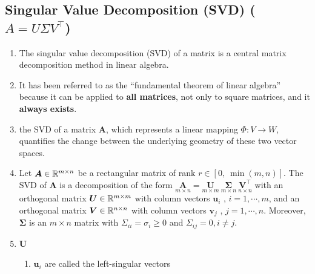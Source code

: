 \subsection{Singular Value Decomposition (SVD) ($A = U \Sigma V^\top$)}



\begin{enumerate}
    \item The singular value decomposition (SVD) of a matrix is a central matrix decomposition method in linear algebra.
    \hfill \cite{mfml/book/mml/Deisenroth-Faisal-Ong}

    \item It has been referred to as the “fundamental theorem of linear algebra” because it can be applied to \textbf{all matrices}, not only to square matrices, and it \textbf{always exists}.
    \hfill \cite{mfml/book/mml/Deisenroth-Faisal-Ong}

    \item the SVD of a matrix $\bm{A}$, which represents a linear mapping $\Phi : V \to W$, quantifies the change between the underlying geometry of these two vector spaces.
    \hfill \cite{mfml/book/mml/Deisenroth-Faisal-Ong}

    \item
    \begin{theorem}
        Let $\bm{A} \in \mathbb{R}^{m\times n}$ be a rectangular matrix of rank $r \in [0,\ \min(m, n)]$.
        The SVD of $\bm{A}$ is a decomposition of the form
        $
            \underset{\displaystyle m\times n}{\bm{A}} =
            \underset{\displaystyle m\times m}{\bm{U}}\
            \underset{\displaystyle m\times n}{\bm{\Sigma}}\
            \underset{\displaystyle n\times n}{\bm{V}^\top}
        $
        with an orthogonal matrix $\bm{U} \in \mathbb{R}^{m\times m}$ with column vectors $\bm{u}_i$ , $i = 1, \cdots , m$, and an orthogonal matrix $\bm{V} \in \mathbb{R}^{n\times n}$ with column vectors $\bm{v}_j$ , $j = 1, \cdots , n$.
        Moreover, $\bm{\Sigma}$ is an $m \times n$ matrix with $\Sigma_{ii} = \sigma_i \geq 0$ and $\Sigma_{ij} = 0, i \neq j$.
        \hfill \cite{mfml/book/mml/Deisenroth-Faisal-Ong}
    \end{theorem}

    \item $\bm{U}$
    \begin{enumerate}
        \item $\bm{u}_i$ are called the left-singular vectors
        \hfill \cite{mfml/book/mml/Deisenroth-Faisal-Ong}
    \end{enumerate}


\end{enumerate}
